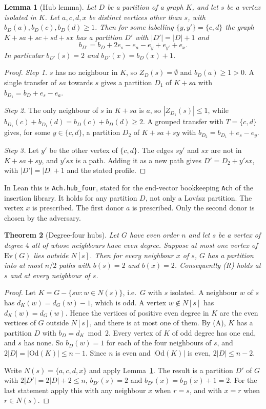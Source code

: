 \documentclass[11pt]{amsart}
\newtheorem{theorem}{Theorem}[section]
\newtheorem{lemma}[theorem]{Lemma}
\theoremstyle{definition}
\newcommand{\Ev}{\mathrm{Ev}}
\newcommand{\Od}{\mathrm{Od}}
\begin{document}
\begin{lemma}[Hub lemma]\label{lem:hub}
Let $D$ be a partition of a graph $K$, and let $s$ be a vertex isolated in $K$. Let $a,c,d,x$ be
distinct vertices other than $s$, with $b_D(a),b_D(c),b_D(d)\ge1$. Then for some labelling
$\{y,y'\}=\{c,d\}$ the graph $K+sa+sc+sd+sx$ has a partition $D'$ with $|D'|=|D|+1$ and
\[
b_{D'}=b_D+2e_s-e_a-e_y+e_{y'}+e_x .
\]
In particular $b_{D'}(s)=2$ and $b_{D'}(x)=b_D(x)+1$.
\end{lemma}

\begin{proof}
\emph{Step 1.} $s$ has no neighbour in $K$, so $Z_D(s)=\emptyset$ and $b_D(a)\ge1>0$. A single
transfer of $sa$ towards $s$ gives a partition $D_1$ of $K+sa$ with $b_{D_1}=b_D+e_s-e_a$.

\emph{Step 2.} The only neighbour of $s$ in $K+sa$ is $a$, so $|Z_{D_1}(s)|\le1$, while
$b_{D_1}(c)+b_{D_1}(d)=b_D(c)+b_D(d)\ge2$. A grouped transfer with $T=\{c,d\}$ gives, for some
$y\in\{c,d\}$, a partition $D_2$ of $K+sa+sy$ with $b_{D_2}=b_{D_1}+e_s-e_y$.

\emph{Step 3.} Let $y'$ be the other vertex of $\{c,d\}$. The edges $sy'$ and $sx$ are not in
$K+sa+sy$, and $y'sx$ is a path. Adding it as a new path gives $D'=D_2+y'sx$, with $|D'|=|D|+1$
and the stated profile.
\end{proof}

In Lean this is \texttt{Ach.hub\_four}, stated for the end-vector bookkeeping \texttt{Ach} of the
insertion library. It holds for any partition $D$, not only a Lov\'asz partition. The vertex $x$ is
prescribed. The first donor $a$ is prescribed. Only the second donor is chosen by the adversary.

\begin{theorem}[Degree-four hubs]\label{thm:hub4}
Let $G$ have even order $n$ and let $s$ be a vertex of degree $4$ all of whose neighbours have
even degree. Suppose at most one vertex of $\Ev(G)$ lies outside $N[s]$. Then for every
neighbour $x$ of $s$, $G$ has a partition into at most $n/2$ paths with $b(s)=2$ and $b(x)=2$.
Consequently (R) holds at $s$ and at every neighbour of $s$.
\end{theorem}

\begin{proof}
Let $K=G-\{sw:w\in N(s)\}$, i.e.\ $G$ with $s$ isolated. A neighbour $w$ of $s$ has
$d_K(w)=d_G(w)-1$, which is odd. A vertex $w\notin N[s]$ has $d_K(w)=d_G(w)$. Hence the vertices
of positive even degree in $K$ are the even vertices of $G$ outside $N[s]$, and there is at most
one of them. By (A), $K$ has a partition $D$ with $b_D=d_K\bmod 2$. Every vertex of $K$ of odd
degree has one end, and $s$ has none. So $b_D(w)=1$ for each of the four neighbours of $s$, and
$2|D|=|\Od(K)|\le n-1$. Since $n$ is even and $|\Od(K)|$ is even, $2|D|\le n-2$.

Write $N(s)=\{a,c,d,x\}$ and apply Lemma~\ref{lem:hub}. The result is a partition $D'$ of $G$ with
$2|D'|=2|D|+2\le n$, $b_{D'}(s)=2$ and $b_{D'}(x)=b_D(x)+1=2$. For the last statement apply this
with any neighbour $x$ when $r=s$, and with $x=r$ when $r\in N(s)$.
\end{proof}
\end{document}
